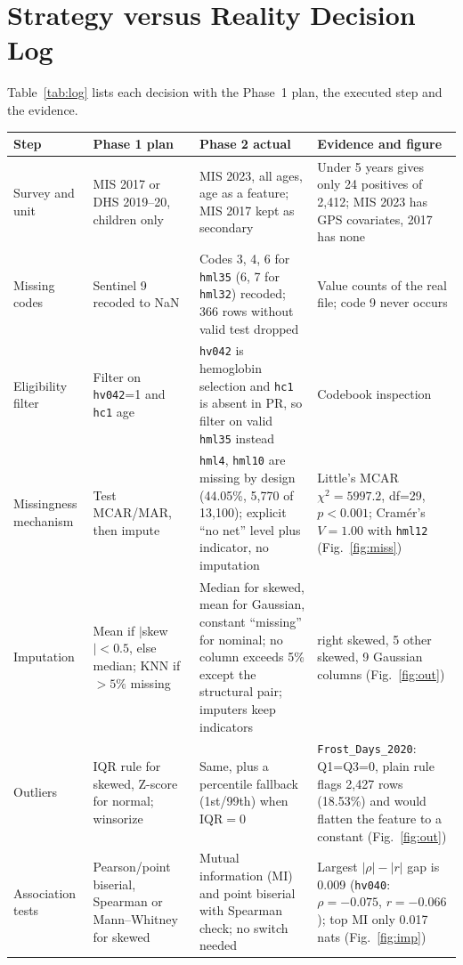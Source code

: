 \documentclass[11pt]{article}
\begin{document}
\section{Strategy versus Reality Decision Log}
Table~\ref{tab:log} lists each decision with the Phase~1 plan, the executed step and the evidence.

\begin{table}[t]
\centering\footnotesize
\renewcommand{\arraystretch}{1.12}
\begin{tabularx}{\textwidth}{>{\raggedright\arraybackslash}p{2.1cm}>{\raggedright\arraybackslash}p{3.7cm}>{\raggedright\arraybackslash}p{4.4cm}>{\raggedright\arraybackslash}X}
\toprule
Step & Phase 1 plan & Phase 2 actual & Evidence and figure\\
\midrule
Survey and unit & MIS 2017 or DHS 2019--20, children only & MIS 2023, all ages, age as a feature; MIS 2017 kept as secondary & Under 5 years gives only 24 positives of 2{,}412; MIS 2023 has GPS covariates, 2017 has none\\
Missing codes & Sentinel 9 recoded to NaN & Codes 3, 4, 6 for \texttt{hml35} (6, 7 for \texttt{hml32}) recoded; 366 rows without valid test dropped & Value counts of the real file; code 9 never occurs\\
Eligibility filter & Filter on \texttt{hv042}=1 and \texttt{hc1} age & \texttt{hv042} is hemoglobin selection and \texttt{hc1} is absent in PR, so filter on valid \texttt{hml35} instead & Codebook inspection\\
Missingness mechanism & Test MCAR/MAR, then impute & \texttt{hml4}, \texttt{hml10} are missing by design (44.05\%, 5{,}770 of 13{,}100); explicit ``no net'' level plus indicator, no imputation & Little's MCAR $\chi^2=5997.2$, df=29, $p<0.001$; Cram\'er's $V=1.00$ with \texttt{hml12} (Fig.~\ref{fig:miss})\\
Imputation & Mean if $|$skew$|<0.5$, else median; KNN if $>5\%$ missing & Median for skewed, mean for Gaussian, constant ``missing'' for nominal; no column exceeds 5\% except the structural pair; imputers keep indicators & 16 right skewed, 5 other skewed, 9 Gaussian columns (Fig.~\ref{fig:out})\\
Outliers & IQR rule for skewed, Z-score for normal; winsorize & Same, plus a percentile fallback (1st/99th) when IQR$=0$ & \texttt{Frost\_Days\_2020}: Q1=Q3=0, plain rule flags 2{,}427 rows (18.53\%) and would flatten the feature to a constant (Fig.~\ref{fig:out})\\
Association tests & Pearson/point biserial, Spearman or Mann--Whitney for skewed & Mutual information (MI) and point biserial with Spearman check; no switch needed & Largest $|\rho|-|r|$ gap is 0.009 (\texttt{hv040}: $\rho=-0.075$, $r=-0.066$); top MI only 0.017 nats (Fig.~\ref{fig:imp})\\

\end{tabularx}
\end{table}
\end{document}
